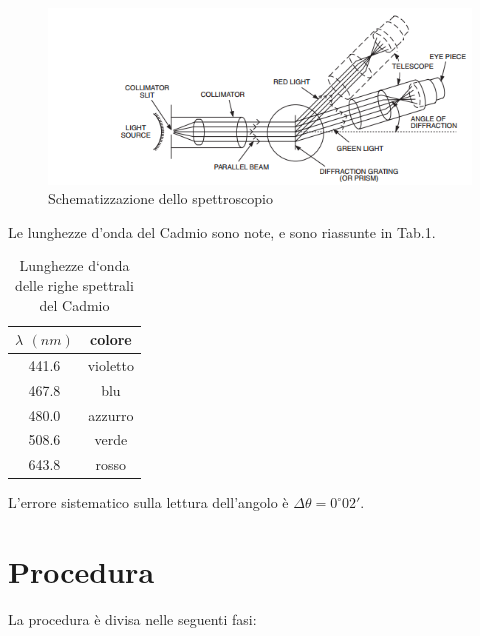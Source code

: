 \documentclass{article}
\begin{document}
\begin{figure}[!ht]
\center
\includegraphics[scale=0.8]{spettroscopio2}
\caption{Schematizzazione dello spettroscopio}
\end{figure}

Le lunghezze d'onda del Cadmio sono note, e sono riassunte in Tab.1.

\begin{table}[h]
 \center
 \begin{tabular}{|c|c|}
   \hline
   $\lambda$ $(nm)$ & colore \\ \hline
   441.6 & violetto \\
   467.8 & blu \\
   480.0 & azzurro \\
   508.6 & verde \\
   643.8 & rosso \\ \hline
 \end{tabular}
 \caption{Lunghezze d`onda delle righe spettrali del Cadmio}
\end{table}

L'errore sistematico sulla lettura dell'angolo è $\Delta\theta = 0^{\circ} 02'$.

\newpage
\section{Procedura}
La procedura è divisa nelle seguenti fasi:
\end{document}
